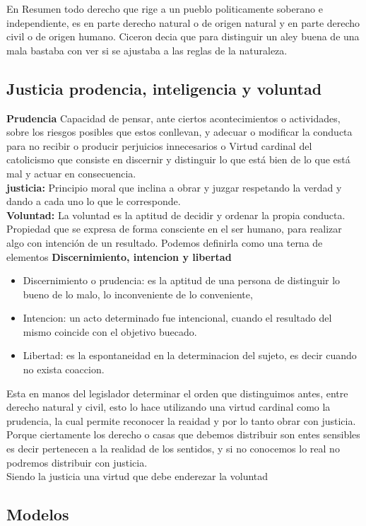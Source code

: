 \documentclass[12pt]{book}
\begin{document}
En Resumen todo derecho que rige a un pueblo politicamente soberano e independiente, es en parte derecho natural o de origen natural y en parte derecho civil o de origen humano.
Ciceron decia que para distinguir un aley buena de una mala bastaba con ver si se ajustaba a las reglas de la naturaleza.


\subsection{Justicia prodencia, inteligencia y voluntad}
\textbf{Prudencia} Capacidad de pensar, ante ciertos acontecimientos o actividades, sobre los riesgos posibles que estos conllevan, y adecuar o modificar la conducta para no recibir o producir perjuicios innecesarios o Virtud cardinal del catolicismo que consiste en discernir y distinguir lo que está bien de lo que está mal y actuar en consecuencia.
\\
\textbf{justicia:} Principio moral que inclina a obrar y juzgar respetando la verdad y dando a cada uno lo que le corresponde.
\\
\textbf{Voluntad:} La voluntad es la aptitud de decidir y ordenar la propia conducta. Propiedad que se expresa de forma consciente en el ser humano, para realizar algo con intención de un resultado.
Podemos definirla como una terna de elementos \textbf{Discernimiento, intencion y libertad}
\begin{itemize}
\item Discernimiento o prudencia: es la aptitud de una persona de distinguir lo bueno de lo malo, lo inconveniente de lo conveniente,
\item Intencion: un acto determinado fue intencional, cuando el resultado del mismo coincide con el objetivo buecado.
\item Libertad: es la espontaneidad en la determinacion del sujeto, es decir cuando no exista coaccion.
\end{itemize}


Esta en manos del legislador determinar el orden que distinguimos antes, entre derecho natural y civil, esto lo hace utilizando una virtud cardinal como la prudencia, la cual permite reconocer la reaidad y por lo tanto obrar con justicia.
Porque ciertamente los derecho o casas que debemos distribuir son entes sensibles es decir pertenecen a la realidad de los sentidos, y si no conocemos lo real no podremos distribuir con justicia.
\\
Siendo la justicia una virtud que debe enderezar la voluntad
\subsection{Modelos}
\end{document}
